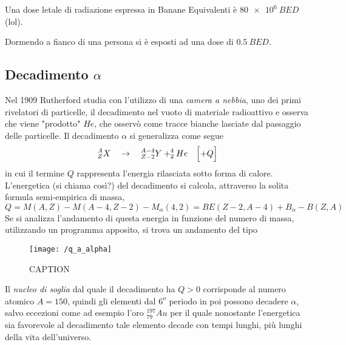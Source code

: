 Una dose letale di radiazione espressa in Banane Equivalenti è $\SI{80e6}{BED}$ (lol).

Dormendo a fianco di una persona si è esposti ad una dose di $\SI{0.5}{BED}$.


\subsection{Decadimento $\alpha$}
Nel 1909 Rutherford studia con l'utilizzo di una \emph{camera a nebbia}, uno dei primi rivelatori di particelle, il decadimento nel vuoto di materiale radioattivo e osserva che viene "prodotto" $He$, che osservò come tracce bianche lasciate dal passaggio delle particelle.
Il decadimento $\alpha$ si generalizza come segue
\begin{equation}
\label{decadimento_alpha}
^{A}_{Z}X \quad\rightarrow\quad ^{A-4}_{Z-2}Y + ^{4}_{2}He \quad \Bigl[  + Q  \Bigr]
\end{equation}
in cui il termine $Q$ rappresenta l'energia rilasciata sotto forma di calore.
L'energetica (si chiama così?) del decadimento si calcola, attraverso la solita formula semi-empirica di massa, 
\begin{equation}
Q = M(A,Z) - M(A-4,Z-2) - M_{\alpha}(4,2) = BE(Z-2,A-4) + B_{\alpha} - B(Z,A)
\end{equation}
Se si analizza l'andamento di questa energia in funzione del numero di massa, utilizzando un programma apposito, si trova un andamento del tipo
\begin{figure}[h]
\centering
\texttt{[image: /q\_a\_alpha]}
\caption{CAPTION}
\end{figure}
Il \emph{nucleo di soglia} dal quale il decadimento ha $Q > 0$ corrisponde al numero atomico $A = 150$, quindi gli elementi dal $6^o$ periodo in poi possono decadere $\alpha$, salvo eccezioni come ad esempio l'oro $^{197}_{79}Au$ per il quale nonostante l'energetica sia favorevole al decadimento tale elemento decade con tempi lunghi, più lunghi della vita dell'universo.

